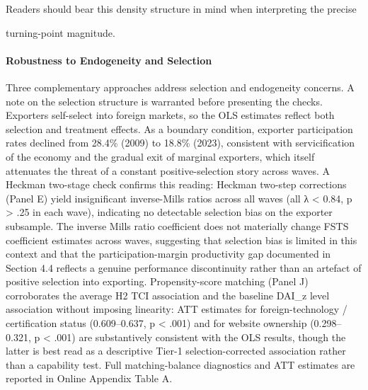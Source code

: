 \documentclass[12pt,a4paper]{article}
\begin{document}
Readers should bear this density structure in mind when interpreting the
precise

turning-point magnitude.

\hypertarget{robustness-to-endogeneity-and-selection}{%
\paragraph{Robustness to Endogeneity and
Selection}\label{robustness-to-endogeneity-and-selection}}

Three complementary approaches address selection and endogeneity
concerns. A note on the selection structure is warranted before
presenting the checks. Exporters self-select into foreign markets, so
the OLS estimates reflect both selection and treatment effects. As a
boundary condition, exporter participation rates declined from 28.4\%
(2009) to 18.8\% (2023), consistent with servicification of the economy
and the gradual exit of marginal exporters, which itself attenuates the
threat of a constant positive-selection story across waves. A Heckman
two-stage check confirms this reading: Heckman two-step corrections
(Panel E) yield insignificant inverse-Mills ratios across all waves (all
\textbar λ\textbar{} \textless{} 0.84, p \textgreater{} .25 in each
wave), indicating no detectable selection bias on the exporter
subsample. The inverse Mills ratio coefficient does not materially
change FSTS coefficient estimates across waves, suggesting that
selection bias is limited in this context and that the
participation-margin productivity gap documented in Section 4.4 reflects
a genuine performance discontinuity rather than an artefact of positive
selection into exporting. Propensity-score matching (Panel J)
corroborates the average H2 TCI association and the baseline DAI\_z
level association without imposing linearity: ATT estimates for
foreign-technology / certification status (0.609--0.637, p \textless{}
.001) and for website ownership (0.298--0.321, p \textless{} .001) are
substantively consistent with the OLS results, though the latter is best
read as a descriptive Tier-1 selection-corrected association rather than
a capability test. Full matching-balance diagnostics and ATT estimates
are reported in Online Appendix Table A.
\end{document}
